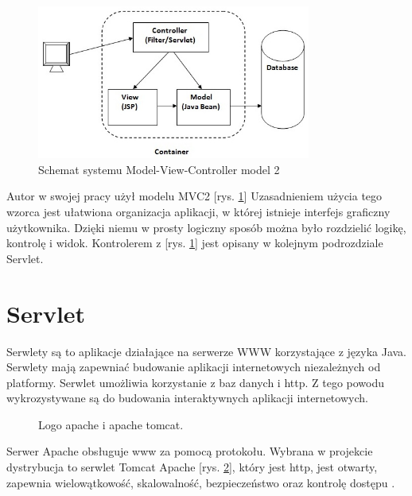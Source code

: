 \documentclass[eng,printmode,oneside]{mgr}
\begin{document}
\begin{figure}[ht!]
\centering
\includegraphics[width=90mm]{model2.jpg}
\caption{Schemat systemu Model-View-Controller model 2\cite{java.mvc.grafika}}
\label{MVC2}
\end{figure}

Autor w swojej pracy użył modelu MVC2 [rys. \ref{MVC2}]
Uzasadnieniem użycia tego wzorca jest ułatwiona organizacja aplikacji, w której
istnieje interfejs graficzny użytkownika. Dzięki niemu w prosty logiczny sposób
można było rozdzielić logikę, kontrolę i widok. Kontrolerem z [rys. \ref{MVC2}]
jest opisany w kolejnym podrozdziale Servlet.

\section{Servlet}

Serwlety są to aplikacje działające na serwerze WWW korzystające z języka Java.
Serwlety mają zapewniać budowanie aplikacji internetowych niezależnych od
platformy. Serwlet umożliwia korzystanie z baz danych i http. Z tego powodu
wykrozystywane są do budowania interaktywnych aplikacji internetowych. 

\begin{figure}
\centering
\vspace{-10pt}
\caption{\label{apache}Logo apache i apache tomcat.}
\vspace{-35pt}
\end{figure}

Serwer Apache obsługuje www za pomocą protokołu. Wybrana w projekcie dystrybucja
to serwlet Tomcat Apache [rys. \ref{apache}], który jest http, jest otwarty,
zapewnia wielowątkowość, skalowalność, bezpieczeństwo oraz kontrolę dostępu
\cite{apache.wiki}.
\end{document}
